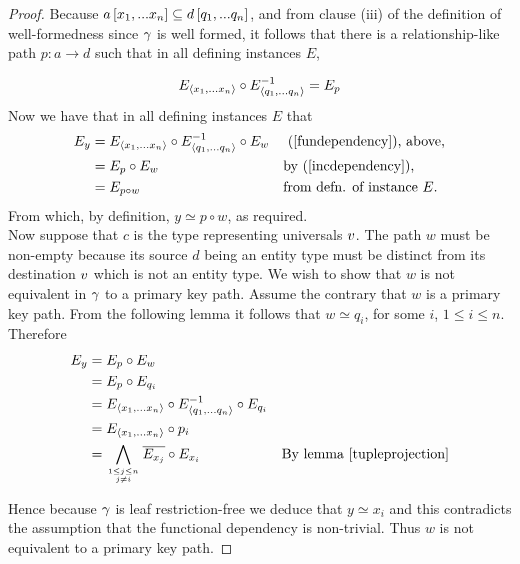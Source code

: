 \begin{proof}
Because $a\left[x_1,...x_n\right]\subseteq d\left[q_1,...q_n\right]$,  and from
clause (iii) of the definition of well-formedness since $\gamma$ is well formed, it follows that
there  is a relationship-like path $p:a \rightarrow d$ such
that 
in all defining instances $E$,

\begin{equation}
\label{incdependency}
E_{\langle x_1,...x_n\rangle} \circ E^{-1}_{\langle q_1,...q_n\rangle} = E_p
\end{equation}
Now we have  that in all defining instances $E$ that 
\begin{align*}
E_y &= E_{\langle x_1,...x_n\rangle} \circ E_{\langle q_1,...q_n\rangle}^{-1} \circ E_w  && \text{ (\ref{fundependency}), above,}\\
    &= E_p \circ E_w                                   && \text{by (\ref{incdependency}),}\\
		&= E_{p \circ w}                                   && \text{from defn. of instance }E.\\
\end{align*} 
\vspace{-0.3cm}
From which, by definition, $y\simeq p \circ w$, as required. \\

Now suppose that $c$ is the type representing universals $v$. The path $w$ must be non-empty because its source $d$ being 
an entity type must be distinct from its destination $v$ which is not an entity type. 
We wish to show that $w$ is not equivalent in $\gamma$ to
a primary key path. Assume the contrary that $w$ is a primary key path. From the following lemma it follows that $w \simeq q_i$, for some
$i$, $1 \leq i \leq n$.  
Therefore
\begin{align*}
E_y &= E_p \circ E_w                                        && \text{}\\
		&= E_p \circ E_{q_i}                                      && \text{}\\
		&= E_{\xntuple} \circ E_{\qntuple}^{-1} \circ E_{q_i}     && \text{}\\
		&= E_{\xntuple} \circ p_i                                 && \text{} \\
		&= \bigwedge\limits_{\genfrac{}{}{0pt}{}{1 \leq j \leq n}{ j \neq i}}{\overline{E_{x_j}}}\circ E_{x_i}  
		                                                        && \text{By lemma \ref{tupleprojection}}
\end{align*} 

Hence because $\gamma$ is leaf  restriction-free we deduce that $y \simeq x_i$ and this contradicts the assumption that the functional dependency
is non-trivial. Thus $w$ is not equivalent to a primary key path.
\end{proof}

